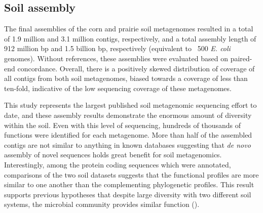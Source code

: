\documentclass[11pt]{article} %
\begin{document}
\subsection{Soil assembly}
The final assemblies of the corn and prairie soil metagenomes resulted
in a total of 1.9 million and 3.1 million contigs, respectively, and a
total assembly length of 912 million bp and 1.5 billion bp,
respectively (equivalent to ~500 \emph{E. coli} genomes).  Without references, these
assemblies were evaluated based on paired-end concordance.  Overall,
there is a positively skewed distribution of coverage of all contigs
from both soil metagenomes, biased towards a coverage of less than
ten-fold, indicative of the low sequencing coverage of these
metagenomes.


This study represents the largest published soil metagenomic sequencing effort
to date, and these assembly results demonstrate the enormous amount of
diversity within the soil.  Even with this level of sequencing,
hundreds of thousands of functions were identified for each metagenome.
More than half of the assembled contigs are not similar to anything in
known databases suggesting that {\em de novo} assembly of novel sequences
holds great benefit for soil metagenomics.  Interestingly, among the
protein coding sequences which were annotated, comparisons of the two
soil datasets suggests that the functional profiles are more similar
to one another than the complementing phylogenetic profiles.  This
result supports previous hypotheses that despite large diversity with
two different soil systems, the microbial community provides similar
function (\cite{Girvan:2005jv,McGradySteed:1997uj,Muller:2002cd,Konstantinidis:2004hr}).
\end{document}
